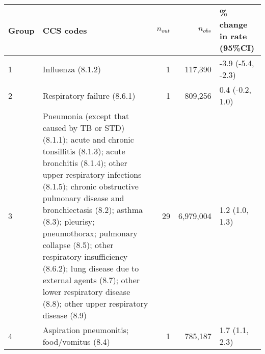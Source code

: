 \begin{tabular}{lp{6.5cm}rrp{2.2cm}}
  \hline
Group & CCS codes & $n_{out}$ & $n_{obs}$ & \% change in rate (95\%CI) \\ 
  \hline
 1 & Influenza (8.1.2) &  1 & 117,390 & -3.9 (-5.4, -2.3) \\ 
   2 & Respiratory failure (8.6.1) &  1 & 809,256 & 0.4 (-0.2, 1.0) \\ 
   3 & Pneumonia (except that caused by TB or STD) (8.1.1); acute and chronic tonsillitis (8.1.3); acute bronchitis (8.1.4); other upper respiratory infections (8.1.5); chronic obstructive pulmonary disease and bronchiectasis (8.2); asthma (8.3); pleurisy; pneumothorax; pulmonary collapse (8.5); other respiratory insufficiency (8.6.2); lung disease due to external agents (8.7); other lower respiratory disease (8.8); other upper respiratory disease (8.9) & 29 & 6,979,004 & 1.2 (1.0, 1.3) \\ 
   4 & Aspiration pneumonitis; food/vomitus (8.4) &  1 & 785,187 & 1.7 (1.1, 2.3) \\ 
   \hline
\end{tabular}

